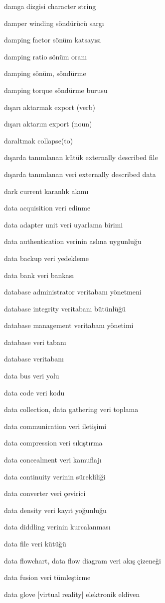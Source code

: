 \documentclass[12pt,fleqn]{article}\usepackage{../../common}
\begin{document}
damga dizgisi character string

damper winding söndürücü sargı

damping factor sönüm katsayısı

damping ratio sönüm oranı

damping sönüm, söndürme

damping torque söndürme burusu

dışarı aktarmak export (verb)

dışarı aktarım export (noun)

daraltmak collapse(to)

dışarda tanımlanan kütük externally described file

dışarda tanımlanan veri externally described data

dark current karanlık akımı

data acquisition veri edinme

data adapter unit veri uyarlama birimi

data authentication verinin aslına uygunluğu

data backup veri yedekleme

data bank veri bankası

database administrator veritabanı yönetmeni

database integrity veritabanı bütünlüğü

database management veritabanı yönetimi

database veri tabanı

database veritabanı

data bus veri yolu

data code veri kodu

data collection, data gathering veri toplama

data communication veri iletişimi

data compression veri sıkıştırma

data concealment veri kamuflajı

data continuity verinin sürekliliği

data converter veri çevirici

data density veri kayıt yoğunluğu

data diddling verinin kurcalanması

data file veri kütüğü

data flowchart, data flow diagram veri akış çizeneği

data fusion veri tümleştirme

data glove [virtual reality] elektronik eldiven
\end{document}
